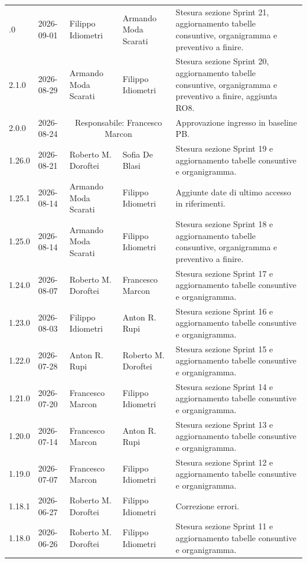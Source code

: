 \begin{longtable}{>{\ttfamily\small}l l l l >{\raggedright\arraybackslash}p{4cm}}
    \bottomrule
    \endlastfoot
    2.2.0 & 2026-09-01 & Filippo Idiometri & Armando Moda Scarati & Stesura sezione Sprint 21, aggiornamento tabelle consuntive, organigramma e preventivo a finire. \\
    2.1.0 & 2026-08-29 & Armando Moda Scarati & Filippo Idiometri & Stesura sezione Sprint 20, aggiornamento tabelle consuntive, organigramma e preventivo a finire, aggiunta RO8. \\
    2.0.0 & 2026-08-24 & \multicolumn{2}{c}{Responsabile: Francesco Marcon} & Approvazione ingresso in baseline PB. \\
    1.26.0 & 2026-08-21 & Roberto M. Doroftei & Sofia De Blasi & Stesura sezione Sprint 19 e aggiornamento tabelle consuntive e organigramma. \\
    1.25.1 & 2026-08-14 & Armando Moda Scarati & Filippo Idiometri & Aggiunte date di ultimo accesso in riferimenti. \\
    1.25.0 & 2026-08-14 & Armando Moda Scarati & Filippo Idiometri & Stesura sezione Sprint 18 e aggiornamento tabelle consuntive, organigramma e preventivo a finire. \\
    1.24.0 & 2026-08-07 & Roberto M. Doroftei & Francesco Marcon & Stesura sezione Sprint 17 e aggiornamento tabelle consuntive e organigramma. \\
    1.23.0 & 2026-08-03 & Filippo Idiometri & Anton R. Rupi & Stesura sezione Sprint 16 e aggiornamento tabelle consuntive e organigramma. \\
    1.22.0 & 2026-07-28 & Anton R. Rupi & Roberto M. Doroftei & Stesura sezione Sprint 15 e aggiornamento tabelle consuntive e organigramma. \\
    1.21.0 & 2026-07-20 & Francesco Marcon & Filippo Idiometri & Stesura sezione Sprint 14 e aggiornamento tabelle consuntive e organigramma. \\
    1.20.0 & 2026-07-14 & Francesco Marcon & Anton R. Rupi & Stesura sezione Sprint 13 e aggiornamento tabelle consuntive e organigramma. \\
    1.19.0 & 2026-07-07 & Francesco Marcon & Filippo Idiometri & Stesura sezione Sprint 12 e aggiornamento tabelle consuntive e organigramma. \\
    1.18.1 & 2026-06-27 & Roberto M. Doroftei & Filippo Idiometri  & Correzione errori. \\
    1.18.0 & 2026-06-26 & Roberto M. Doroftei & Filippo Idiometri  & Stesura sezione Sprint 11 e aggiornamento tabelle consuntive e organigramma. \\

\end{longtable}

